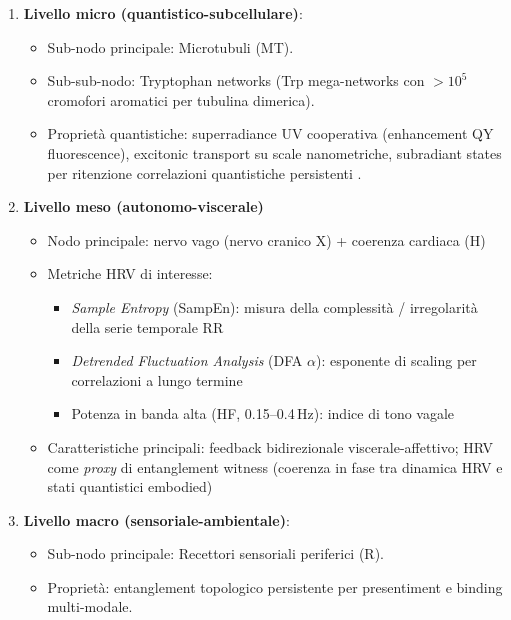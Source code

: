 \documentclass[11pt,a4paper]{article}
\let\oldcite\cite
\renewcommand{\cite}{\protect\oldcite}
\theoremstyle{plain}
\theoremstyle{definition}
\begin{document}
\begin{enumerate}
    \item \textbf{Livello micro (quantistico-subcellulare)}:
    \begin{itemize}
        \item Sub-nodo principale: Microtubuli (MT).
        \item Sub-sub-nodo: Tryptophan networks (Trp mega-networks con $>10^5$ cromofori aromatici per tubulina dimerica).
        \item Proprietà quantistiche: superradiance UV cooperativa (enhancement QY fluorescence), excitonic transport su scale nanometriche, subradiant states per ritenzione correlazioni quantistiche persistenti \cite{babcock2024superradiance, wiest2025}.
    \end{itemize}

    \vspace{0.3cm}
    
   \item \textbf{Livello meso (autonomo-viscerale)}
    \begin{itemize}
        \item Nodo principale: nervo vago (nervo cranico X) + coerenza cardiaca (H)
        \item Metriche HRV di interesse:
        \begin{itemize}
            \item \textit{Sample Entropy} (SampEn): misura della complessità / irregolarità della serie temporale RR
            \item \textit{Detrended Fluctuation Analysis} (DFA $\alpha$): esponente di scaling per correlazioni a lungo termine
            \item Potenza in banda alta (HF, 0.15--0.4\,Hz): indice di tono vagale
        \end{itemize}
        \item Caratteristiche principali: feedback bidirezionale viscerale-affettivo; HRV come \textit{proxy} di entanglement witness (coerenza in fase tra dinamica HRV e stati quantistici embodied)
    \end{itemize}

    \vspace{0.3cm}
    
    \item \textbf{Livello macro (sensoriale-ambientale)}:
    \begin{itemize}
        \item Sub-nodo principale: Recettori sensoriali periferici (R).
        \item Proprietà: entanglement topologico persistente per presentiment e binding multi-modale.
    \end{itemize}
\end{enumerate}
\end{document}
